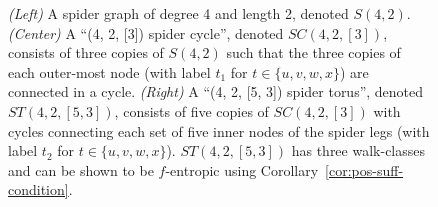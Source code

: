 \begin{figure}[!ht]
  \centering
  \resizebox{0.9\linewidth}{!}{}
  \caption{
      \emph{(Left)} A spider graph of degree 4 and length 2, denoted $S(4,2)$.
      \emph{(Center)} A ``(4, 2, [3]) spider cycle'', denoted $SC(4,2,[3])$, consists of three copies of $S(4,2)$ such that the three copies of each outer-most node (with label $t_1$ for $t \in \{u,v,w,x\}$)  are connected in a cycle.
      \emph{(Right)} A ``(4, 2, [5, 3]) spider torus'', denoted $ST(4,2,[5,3])$, consists of five copies of $SC(4,2,[3])$ with cycles connecting each set of five inner nodes of the spider legs (with label $t_2$ for $t \in \{u,v,w,x\}$).  $ST(4,2,[5,3])$ has three walk-classes and can be shown to be $f$-entropic using Corollary~\ref{cor:pos-suff-condition}.
  }\label{fig:spidertorus}
\end{figure}
